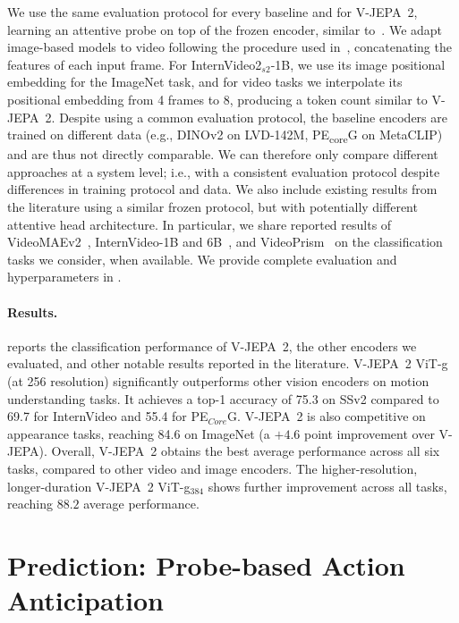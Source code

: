 \documentclass[]{fairmeta}
\newcommand{\model}{V-JEPA~2\xspace}
\newcommand{\oldModel}{V-JEPA\xspace}
\begin{document}
We use the same evaluation protocol for every baseline and for \model, learning an attentive probe on top of the frozen encoder, similar to~\citet{bardes2024revisiting}. We adapt image-based models to video following the procedure used in~\citet{oquab2023dinov2}, concatenating the features of each input frame. For InternVideo2$_{s2}$-1B, we use its image positional embedding for the ImageNet task, and for video tasks we interpolate its positional embedding from 4 frames to 8, producing a token count similar to \model. Despite using a common evaluation protocol, the baseline encoders are trained on different data (e.g., DINOv2 on LVD-142M, PE\textsubscript{core}G on MetaCLIP) and are thus not directly comparable. We can therefore only compare different approaches at a system level; i.e., with a consistent evaluation protocol despite differences in training protocol and data. We also include existing results from the literature using a similar frozen protocol, but with potentially different attentive head architecture. In particular, we share reported results of VideoMAEv2~\citep{wang2023videomae}, InternVideo-1B and 6B~\citep{wang2024internvideo2},  and VideoPrism~\citep{zhang2024video} on the classification tasks we consider, when available. We provide complete evaluation and hyperparameters in .


\paragraph{\bf Results.}
 reports the classification performance of \model, the other encoders we evaluated, and other notable results reported in the literature. \model ViT-g (at 256 resolution) significantly outperforms other vision encoders on motion understanding tasks. It achieves a top-1 accuracy of 75.3 on SSv2 compared to 69.7 for InternVideo and 55.4 for PE$_{Core}$G. \model is also competitive on appearance tasks, reaching 84.6 on ImageNet (a $+4.6$ point improvement over \oldModel). Overall, \model obtains the best average performance across all six tasks, compared to other video and image encoders. The higher-resolution, longer-duration \model ViT-g$_{384}$ shows further improvement across all tasks, reaching $88.2$ average performance. 


\section{Prediction: Probe-based Action Anticipation}
\label{section:prediction}
\end{document}
